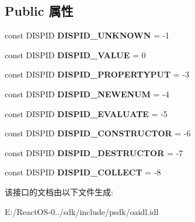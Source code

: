 \subsection*{Public 属性}
\begin{DoxyCompactItemize}
\item 
\mbox{\label{interface_i_dispatch_abace79e3b8c396038ae4bbc867cfd72a}} 
const D\+I\+S\+P\+ID {\bfseries D\+I\+S\+P\+I\+D\+\_\+\+U\+N\+K\+N\+O\+WN} = -\/1
\item 
\mbox{\label{interface_i_dispatch_a503a1bcbc3091882b7ebc80a588baf4f}} 
const D\+I\+S\+P\+ID {\bfseries D\+I\+S\+P\+I\+D\+\_\+\+V\+A\+L\+UE} = 0
\item 
\mbox{\label{interface_i_dispatch_affb809fedafc1fb711b672abe3caf84c}} 
const D\+I\+S\+P\+ID {\bfseries D\+I\+S\+P\+I\+D\+\_\+\+P\+R\+O\+P\+E\+R\+T\+Y\+P\+UT} = -\/3
\item 
\mbox{\label{interface_i_dispatch_a0f9f5c814c7a883eec9f809bb8788beb}} 
const D\+I\+S\+P\+ID {\bfseries D\+I\+S\+P\+I\+D\+\_\+\+N\+E\+W\+E\+N\+UM} = -\/4
\item 
\mbox{\label{interface_i_dispatch_ac65927333e434bca0ef8fde0fa4da661}} 
const D\+I\+S\+P\+ID {\bfseries D\+I\+S\+P\+I\+D\+\_\+\+E\+V\+A\+L\+U\+A\+TE} = -\/5
\item 
\mbox{\label{interface_i_dispatch_a21b91aa78612cdecf4442e27c3e86507}} 
const D\+I\+S\+P\+ID {\bfseries D\+I\+S\+P\+I\+D\+\_\+\+C\+O\+N\+S\+T\+R\+U\+C\+T\+OR} = -\/6
\item 
\mbox{\label{interface_i_dispatch_ad06f961db147df547390b05c7bc55a4c}} 
const D\+I\+S\+P\+ID {\bfseries D\+I\+S\+P\+I\+D\+\_\+\+D\+E\+S\+T\+R\+U\+C\+T\+OR} = -\/7
\item 
\mbox{\label{interface_i_dispatch_ab0fae2bb781e6019e7cbff4fb8f3013f}} 
const D\+I\+S\+P\+ID {\bfseries D\+I\+S\+P\+I\+D\+\_\+\+C\+O\+L\+L\+E\+CT} = -\/8
\end{DoxyCompactItemize}


该接口的文档由以下文件生成\+:\begin{DoxyCompactItemize}
\item 
E\+:/\+React\+O\+S-\/0../sdk/include/psdk/oaidl.\+idl\end{DoxyCompactItemize}
